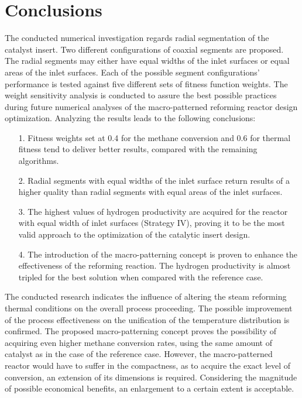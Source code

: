 \documentclass[preprint,12pt]{elsarticle}
\begin{document}
\clearpage


\section{Conclusions}

The conducted numerical investigation regards radial segmentation of the catalyst insert. Two different configurations of coaxial segments are proposed. The radial segments may either have equal widths of the inlet surfaces or equal areas of the inlet surfaces. Each of the possible segment configurations' performance is tested against five different sets of fitness function weights. The weight sensitivity analysis is conducted to assure the best possible practices during future numerical analyses of the macro-patterned reforming reactor design optimization. Analyzing the results leads to the following conclusions:

\begin{itemize}
\item [1.] Fitness weights set at 0.4 for the methane conversion and 0.6 for thermal fitness tend to deliver better results, compared with the remaining algorithms.  
\item[2.] Radial segments with equal widths of the inlet surface return results of a higher quality than radial segments with equal areas of the inlet surfaces.
\item[3.] The highest values of hydrogen productivity are acquired for the reactor with equal width of inlet surfaces (Strategy IV),  proving it to be the most valid approach to the optimization of the catalytic insert design.
\item[4.] The introduction of the macro-patterning concept is proven to enhance the effectiveness of the reforming reaction. The hydrogen productivity is almost tripled for the best solution when compared with the reference case.
\end{itemize}

The conducted research indicates the influence of altering the steam reforming thermal conditions on the overall process proceeding. The possible improvement of the process effectiveness on the unification of the temperature distribution is confirmed. The proposed macro-patterning concept proves the possibility of acquiring even higher methane conversion rates, using the same amount of catalyst as in the case of the reference case. However, the macro-patterned reactor would have to suffer in the compactness, as to acquire the exact level of conversion, an extension of its dimensions is required. Considering the magnitude of possible economical benefits, an enlargement to a certain extent is acceptable. 

\clearpage

 





\end{document}
